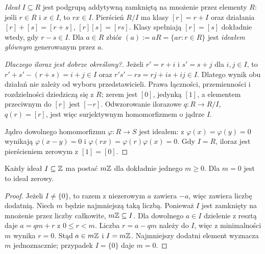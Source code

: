 \begin{definicja}
\label{def:ideal-iloraz}
\emph{Ideał} $I\subseteq R$ jest podgrupą
addytywną zamkniętą na mnożenie przez
elementy $R$: jeśli $r\in R$ i $x\in I$,
to $rx\in I$. Pierścień $R/I$ ma klasy
$[r]=r+I$ oraz działania
$[r]+[s]=[r+s]$, $[r][s]=[rs]$.
Klasy spełniają $[r]=[s]$ dokładnie wtedy, gdy
$r-s\in I$. Dla $a\in R$ zbiór
$(a):=aR=\{ar:r\in R\}$ jest \emph{ideałem głównym}
generowanym przez $a$.
\end{definicja}

\begin{proof}[Dlaczego iloraz jest dobrze określony?]
Jeżeli $r'=r+i$ i $s'=s+j$ dla $i,j\in I$,
to $r'+s'-(r+s)=i+j\in I$ oraz
$r's'-rs=rj+is+ij\in I$.
Dlatego wynik obu działań nie zależy od
wyboru przedstawicieli. Prawa łączności, przemienności
i rozdzielności dziedziczą się z $R$;
zerem jest $[0]$, jedynką $[1]$, a elementem
przeciwnym do $[r]$ jest $[-r]$.
Odwzorowanie ilorazowe $q:R\to R/I$, $q(r)=[r]$,
jest więc surjektywnym homomorfizmem o jądrze $I$.

Jądro dowolnego homomorfizmu $\varphi:R\to S$ jest ideałem:
z $\varphi(x)=\varphi(y)=0$ wynikają
$\varphi(x-y)=0$ i
$\varphi(rx)=\varphi(r)\varphi(x)=0$.
Gdy $I=R$, iloraz jest pierścieniem zerowym
z $[1]=[0]$.
\end{proof}

\begin{stwierdzenie}
\label{prop:idealy-Z-5}
Każdy ideał $I\subseteq\mathbb{Z}$ ma postać $m\mathbb{Z}$ dla dokładnie
jednego $m\geq0$. Dla $m=0$ jest to ideał zerowy.
\end{stwierdzenie}
\begin{proof}
Jeżeli $I\ne\{0\}$, to razem z niezerowym $a$ zawiera $-a$,
więc zawiera liczbę dodatnią. Niech $m$ będzie najmniejszą taką
liczbą. Ponieważ $I$ jest zamknięty na mnożenie przez liczby
całkowite, $m\mathbb{Z}\subseteq I$. Dla dowolnego $a\in I$
dzielenie z resztą daje $a=qm+r$ z $0\leq r<m$.
Liczba $r=a-qm$ należy do $I$, więc z minimalności $m$
wynika $r=0$. Stąd $a\in m\mathbb{Z}$ i $I=m\mathbb{Z}$.
Najmniejszy dodatni element wyznacza $m$ jednoznacznie;
przypadek $I=\{0\}$ daje $m=0$.
\end{proof}

